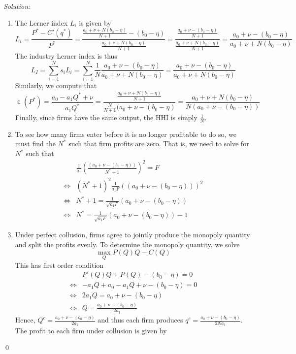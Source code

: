 \documentclass[12pt]{article}
\DeclareMathOperator{\eps}{\varepsilon}
\newenvironment{sol}
    {\emph{Solution:}
    }
    {
    \qed
    }
\begin{document}
\begin{sol}
\begin{enumerate}[label=\alph*) ]
     \item The Lerner index $L_i$ is given by
     \[L_i = \frac{P^* - C'(q^*)}{P^*} = \frac{\frac{a_0 + \nu + N(b_0 - \eta)}{N+1} - (b_0 - \eta)}{\frac{a_0 + \nu + N(b_0 - \eta)}{N+1} } = \frac{\frac{a_0 + \nu - (b_0 - \eta)}{N+1}}{\frac{a_0 + \nu + N(b_0 - \eta)}{N+1}} = \frac{a_0 + \nu - (b_0 - \eta)}{a_0 + \nu + N(b_0 - \eta)}\]
     The industry Lerner index is thus
     \[L_I = \sum_{i=1}^N s_i L_i = \sum_{i=1}^N \frac{1}{N} \frac{a_0 + \nu - (b_0 - \eta)}{a_0 + \nu + N(b_0 - \eta)} =\frac{a_0 + \nu - (b_0 - \eta)}{a_0 + \nu + N(b_0 - \eta)} \]
     Similarly, we compute that
     \[\eps(P^*) = \frac{a_0 - a_1 Q^* + \nu}{a_1 Q^*} = \frac{\frac{a_0 + \nu + N(b_0 - \eta)}{N+1}}{\frac{N}{N+1}(a_0 + \nu - (b_0 - \eta)} = \frac{a_0 + \nu + N(b_0 - \eta)}{N(a_0 + \nu - (b_0 - \eta))}\]
     Finally, since firms have the same output, the HHI is simply $\frac{1}{N}$.
     \item To see how many firms enter before it is no longer profitable to do so, we must find the $N^*$ such that firm profits are zero. That is, we need to solve for $N^*$ such that
     \begin{align*}
        &\frac{1}{a_1}\left(\frac{(a_0 + \nu - (b_0 - \eta))}{N^*+1}\right)^2 = F\\
        \iff & (N^*+1)^2\frac{1}{a_1 F }\left((a_0 + \nu - (b_0 - \eta))\right)^2\\
        \iff& N^* +1 = \frac{1}{\sqrt{a_1 F}}(a_0 + \nu - (b_0 - \eta))\\
        \iff& N^* =  \frac{1}{\sqrt{a_1 F}}(a_0 + \nu - (b_0 - \eta)) - 1
     \end{align*}
     \item Under perfect collusion, firms agree to jointly produce the monopoly quantity and split the profits evenly. To determine the monopoly quantity, we solve
     \[\max_{Q} P(Q)Q - C(Q)\]
     This has first order condition
     \begin{align*}
        &P'(Q) Q + P(Q) - (b_0 - \eta) = 0\\
        \iff & - a_1 Q + a_0 - a_1Q + \nu - (b_0 - \eta) = 0\\
        \iff & 2 a_1 Q = a_0 + \nu - (b_0 - \eta)\\
        \iff & Q = \frac{a_0 + \nu - (b_0 - \eta)}{2 a_1}
     \end{align*}
     Hence, $Q^c = \frac{a_0 + \nu - (b_0 - \eta)}{2 a_1}$ and thus each firm produces $q^c = \frac{a_0 + \nu -(b_0 - \eta)}{2 N a_1}$. The profit to each firm under collusion is given by

\end{enumerate}
\end{sol}
\end{document}
